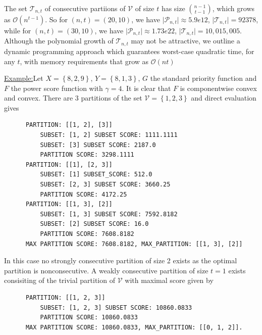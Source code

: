 \documentclass{article}
\theoremstyle{case}
\newenvironment{example}[1]{\par\noindent\underline{Example:}\space#1}{}
\begin{document}
The set $\mathcal{T}_{n,t}$ of consecutive partiions of $\mathcal{V}$ of size $t$ has size $\binom{n-1}{t-1}$, which grows as $\mathcal{O}\left( n^{t-1}\right)$. So for $\left(n,t\right) = \left(20, 10\right)$, we have $\vert \mathcal{P}_{n,t}\vert \approx 5.9e12$, $\vert \mathcal{T}_{n,t}\vert = 92378$, while for $\left(n,t\right) = \left(30, 10\right)$, we have $\vert \mathcal{P}_{n,t}\vert \approx 1.73e22$, $\vert \mathcal{T}_{n,t}\vert = 10,015,005$.  Although the polynomial growth of $\mathcal{T}_{n,t}$ may not be attractive, we outline a dynamic programming approach which guarantees worst-case quadratic time, for any $t$, with memory requirements that grow as $\mathcal{O}\left( nt\right)$


\vspace{4pt}

\begin{example}
Let $X = \left\lbrace 8, 2, 9\right\rbrace$, $Y = \left\lbrace  8, 1, 3\right\rbrace$, $G$ the standard priority function and $F$ the power score function with $\gamma = 4$. It is clear that $F$ is componentwise convex and convex. There are 3 partitions of the set $\mathcal{V} = \left\lbrace 1,2,3 \right\rbrace$ and direct evaluation gives
\begin{verbatim}
      PARTITION: [[1, 2], [3]]
          SUBSET: [1, 2] SUBSET SCORE: 1111.1111
          SUBSET: [3] SUBSET SCORE: 2187.0
          PARTITION SCORE: 3298.1111
      PARTITION: [[1], [2, 3]]
          SUBSET: [1] SUBSET_SCORE: 512.0
          SUBSET: [2, 3] SUBSET SCORE: 3660.25
          PARTITION SCORE: 4172.25
      PARTITION: [[1, 3], [2]]
          SUBSET: [1, 3] SUBSET SCORE: 7592.8182
          SUBSET: [2] SUBSET SCORE: 16.0
          PARTITION SCORE: 7608.8182
      MAX PARTITION SCORE: 7608.8182, MAX_PARTITION: [[1, 3], [2]]
\end{verbatim}
In this case no strongly consecutive partition of size 2 exists as the optimal partition is nonconsecutive. A weakly consecutive partition of size $t = 1$ exists consisiting of the trivial partition of $\mathcal{V}$ with maximal score given by
\begin{verbatim}
      PARTITION: [[1, 2, 3]]
          SUBSET: [1, 2, 3] SUBSET SCORE: 10860.0833
          PARTITION SCORE: 10860.0833
      MAX PARTITION SCORE: 10860.0833, MAX_PARTITION: [[0, 1, 2]].
\end{verbatim}  
\end{example}
\end{document}
